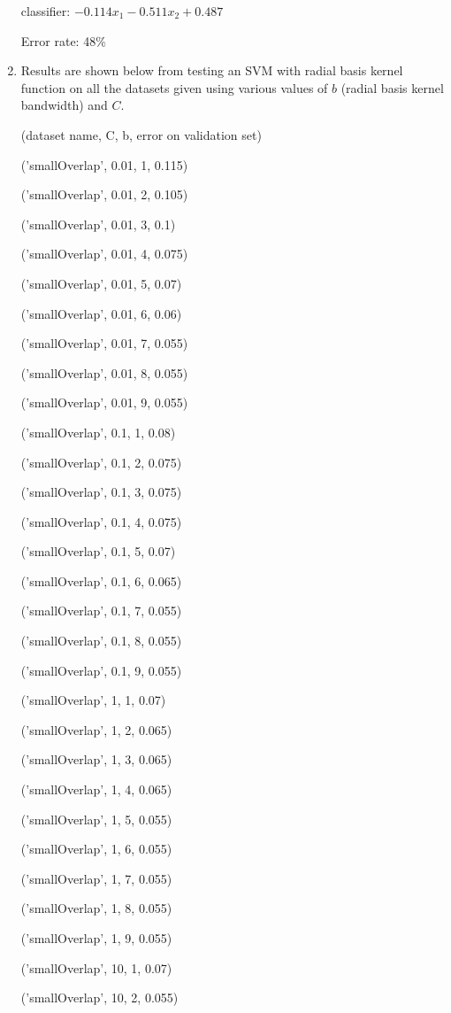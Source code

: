 \documentclass{paper}
\begin{document}
\begin{enumerate}
classifier: $-0.114 x_1 -0.511 x_2 + 0.487$

Error rate: 48\%

    \item

    Results are shown below from testing an SVM with radial basis kernel function on all the datasets given using various values of $b$ (radial basis kernel bandwidth) and $C$.

(dataset name, C, b, error on validation set)

('smallOverlap', 0.01, 1, 0.115)

('smallOverlap', 0.01, 2, 0.105)

('smallOverlap', 0.01, 3, 0.1)

('smallOverlap', 0.01, 4, 0.075)

('smallOverlap', 0.01, 5, 0.07)

('smallOverlap', 0.01, 6, 0.06)

('smallOverlap', 0.01, 7, 0.055)

('smallOverlap', 0.01, 8, 0.055)

('smallOverlap', 0.01, 9, 0.055)

('smallOverlap', 0.1, 1, 0.08)

('smallOverlap', 0.1, 2, 0.075)

('smallOverlap', 0.1, 3, 0.075)

('smallOverlap', 0.1, 4, 0.075)

('smallOverlap', 0.1, 5, 0.07)

('smallOverlap', 0.1, 6, 0.065)

('smallOverlap', 0.1, 7, 0.055)

('smallOverlap', 0.1, 8, 0.055)

('smallOverlap', 0.1, 9, 0.055)

('smallOverlap', 1, 1, 0.07)

('smallOverlap', 1, 2, 0.065)

('smallOverlap', 1, 3, 0.065)

('smallOverlap', 1, 4, 0.065)

('smallOverlap', 1, 5, 0.055)

('smallOverlap', 1, 6, 0.055)

('smallOverlap', 1, 7, 0.055)

('smallOverlap', 1, 8, 0.055)

('smallOverlap', 1, 9, 0.055)

('smallOverlap', 10, 1, 0.07)

('smallOverlap', 10, 2, 0.055)


\end{enumerate}
\end{document}
